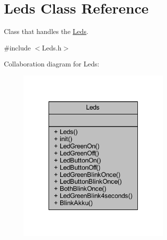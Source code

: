 \hypertarget{class_leds}{}\section{Leds Class Reference}
\label{class_leds}


Class that handles the \hyperlink{class_leds}{Leds}.  




{\ttfamily \#include $<$Leds.\+h$>$}



Collaboration diagram for Leds\+:\nopagebreak
\begin{figure}[H]
\begin{center}
\leavevmode
\includegraphics[width=216pt]{class_leds__coll__graph}
\end{center}
\end{figure}
